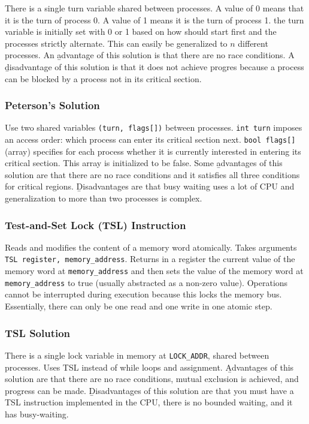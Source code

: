 \documentclass{article}
\begin{document}
    There is a single turn variable shared between processes. A value of 0 means that it is the turn of process 0. A value of 1 means it is the turn of process 1. the turn variable is initially set with 0 or 1 based on how should start first and the processes strictly alternate. This can easily be generalized to $n$ different processes. An \b{advantage} of this solution is that there are no race conditions. A \b{disadvantage} of this solution is that it does not achieve progres because a process can be blocked by a process not in its critical section.

    \subsubsection{Peterson's Solution}

    Use two shared variables \texttt{(turn, flags[])} between processes. \texttt{int turn} imposes an access order: which process can enter its critical section next. \texttt{bool flags[]} (array) specifies for each process whether it is currently interested in entering its critical section. This array is initialized to be false. Some \b{advantages} of this solution are that there are no race conditions and it satisfies all three conditions for critical regions. \b{Disadvantages} are that busy waiting uses a lot of CPU and generalization to more than two processes is complex. 

    \subsubsection{Test-and-Set Lock (TSL) Instruction}

    Reads and modifies the content of a memory word atomically. Takes arguments \texttt{TSL register, memory\_address}. Returns in a register the current value of the memory word at \texttt{memory\_address} and then sets the value of the memory word at \texttt{memory\_address} to true (usually abstracted as a non-zero value). Operations cannot be interrupted during execution because this locks the memory bus. Essentially, there can only be one read and one write in one atomic step. 

    \subsubsection{TSL Solution}

    There is a single lock variable in memory at \texttt{LOCK\_ADDR}, shared between processes. Uses TSL instead of while loops and assignment. \b{Advantages} of this solution are that there are no race conditions, mutual exclusion is achieved, and progress can be made. \b{Disadvantages} of this solution are that you must have a TSL instruction implemented in the CPU, there is no bounded waiting, and it has busy-waiting. 
        
\end{document}
